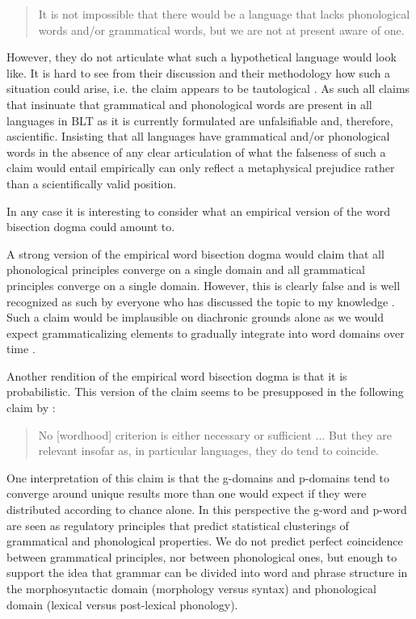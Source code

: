 \documentclass[output=paper,hidelinks]{langscibook}
\begin{document}
\begin{quote}
It is not impossible that there would be a language that lacks phonological words and/or grammatical words, but we are not at present aware of one. \citep[32]{dixonaikhenvald02}
\end{quote}

However, they do not articulate what such a hypothetical language would look like. It is hard to see from their discussion and their methodology how such a situation could arise, i.e. the claim appears to be tautological \citep{tallman2020beyond}. As such all claims that insinuate that grammatical and phonological words are present in all languages in BLT as it is currently formulated are unfalsifiable and, therefore, ascientific. Insisting that all languages have grammatical and/or phonological words in the absence of any clear articulation of what the falseness of such a claim would entail empirically can only reflect a metaphysical prejudice rather than a scientifically valid position.

In any case it is interesting to consider what an empirical version of the word bisection dogma could amount to.

A strong version of the empirical word bisection dogma would claim that all phonological principles converge on a single domain and all grammatical principles converge on a single domain. However, this is clearly false and is well recognized as such by everyone who has discussed the topic to my knowledge \citep{carnie2000definition, hildebrandt2007grammatical, bickel2009distribution, Bickel2017, haspelmathword:2011, tallman2023measuring}. Such a claim would be implausible on diachronic grounds alone as we would expect grammaticalizing elements to gradually integrate into word domains over time \citep{bybee1998prosody, schiering2006cliticization}. 

Another rendition of the empirical word bisection dogma is that it is probabilistic. This version of the claim seems to be presupposed in the following claim by \citet[274]{matthews:words}:

\begin{quote}
No [wordhood] criterion is either necessary or sufficient ... But they are relevant insofar as, in particular languages, they do tend to coincide.
\end{quote}

One interpretation of this claim is that the g-domains and p-domains tend to converge around unique results more than one would expect if they were distributed according to chance alone. In this perspective the g-word and p-word are seen as regulatory principles that predict statistical clusterings of grammatical and phonological properties. We do not predict perfect coincidence between grammatical principles, nor between phonological ones, but enough to support the idea that grammar can be divided into word and phrase structure in the morphosyntactic domain (morphology versus syntax) and phonological domain (lexical versus post-lexical phonology).
\end{document}
